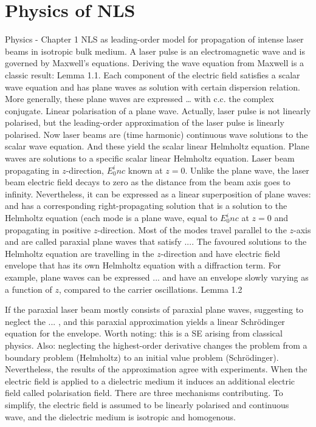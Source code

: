 \section{Physics of NLS}
Physics - Chapter 1
NLS as leading-order model for propagation of intense laser beams in isotropic bulk medium. A laser pulse is an electromagnetic wave and is governed by Maxwell’s equations.
Deriving the wave equation from Maxwell is a classic result: Lemma 1.1.
Each component of the electric field satisfies a scalar wave equation and has plane waves as solution with certain dispersion relation. More generally, these plane waves are expressed … with c.c. the complex conjugate.
Linear polarisation of a plane wave. Actually, laser pulse is not linearly polarised, but the leading-order approximation of the laser pulse is linearly polarised.
Now laser beams are (time harmonic) continuous wave solutions to the scalar wave equation. And these yield the scalar linear Helmholtz equation. Plane waves are solutions to a specific scalar linear Helmholtz equation.
Laser beam propagating in $z$-direction, $E_0^inc$ known at $z=0$. Unlike the plane wave, the laser beam electric field decays to zero as the distance from the beam axis goes to infinity. Nevertheless, it can be expressed as a linear superposition of plane waves: and has a corresponding right-propagating solution that is a solution to the Helmholtz equation (each mode is a plane wave, equal to $E_0^inc$ at $z=0$ and propagating in positive $z$-direction. Most of the modes travel parallel to the $z$-axis and are called paraxial plane waves that satisfy .... The favoured solutions to the Helmholtz equation are travelling in the $z$-direction and have electric field envelope that has its own Helmholtz equation with a diffraction term. For example, plane waves can be expressed ... and have an envelope slowly varying as a function of $z$, compared to the carrier oscillations. Lemma 1.2

If the paraxial laser beam mostly consists of paraxial plane waves, suggesting to neglect the ... , and this paraxial approximation yields a linear Schrödinger equation for the envelope. Worth noting: this is a SE arising from classical physics. Also: neglecting the highest-order derivative changes the problem from a boundary problem (Helmholtz) to an initial value problem (Schrödinger). Nevertheless, the results of the approximation agree with experiments. When the electric field is applied to a dielectric medium it induces an additional electric field called polarisation field. There are three mechanisms contributing. To simplify, the electric field is assumed to be linearly polarised and continuous wave, and the dielectric medium is isotropic and homogenous. 

